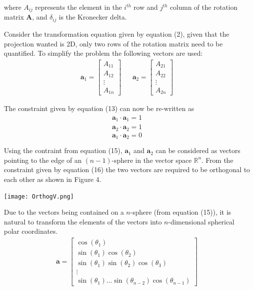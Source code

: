 \documentclass[a4paper,11pt,twoside]{article}
\begin{document}
where $A_{ij}$ represents the element in the $i^{th}$ row and $j^{th}$ column of the rotation matrix $\bm{A}$, and $\delta_{ij}$ is the Kronecker delta. 
\newline

Consider the transformation equation given by equation (2), given that the projection wanted is 2D, only two rows of the rotation matrix need to be quantified. To simplify the problem the following vectors are used: 
\begin{align}
\bm{a}_1 = \begin{bmatrix}
           A_{11} \\
           A_{12} \\
           \vdots \\
           A_{1n}
           \end{bmatrix} 
           && 
\bm{a}_2 = \begin{bmatrix}
           A_{21} \\
           A_{22} \\
           \vdots \\
           A_{2n}
           \end{bmatrix}
\end{align} 

The constraint given by equation (13) can now be re-written as
\begin{equation}
\begin{split}
\bm{a}_1 \cdot \bm{a}_1 = 1 
\\
\bm{a}_2 \cdot \bm{a}_2 = 1
\end{split}
\end{equation}
\begin{equation}
\bm{a}_1 \cdot \bm{a}_2 = 0
\end{equation}

Using the contraint from equation (15), $\bm{a}_1$ and $\bm{a}_2$ can be considered as vectors pointing to the edge of an $(n-1)$-sphere in the vector space $\mathbb{R}^n$. From the constraint given by equation (16) the two vectors are required to be orthogonal to each other as shown in Figure 4. 
\begin{center}
\texttt{[image: OrthogV.png]}

\end{center}

Due to the vectors being contained on a $n$-sphere (from equation (15)), it is natural to transform the elements of the vectors into $n$-dimensional spherical polar coordinates. 
\begin{align}
\bm{a} = \begin{bmatrix}
           \cos(\theta_1) \\
           \sin(\theta_1)\cos(\theta_2) \\
           \sin(\theta_1)\sin(\theta_2)\cos(\theta_3) \\
           \vdots \\
           \sin(\theta_1) \dotsc \sin(\theta_{n-2})\cos(\theta_{n-1})
           \end{bmatrix}
\end{align}
\end{document}
